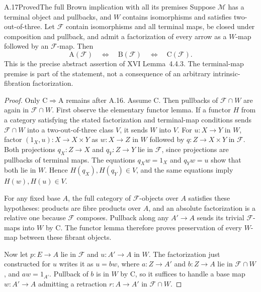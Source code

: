 \begin{claim}{A.17}{Proved}{The full Brown implication with all its premises}
Suppose $\mathcal M$ has a terminal object and pullbacks, and $W$ contains isomorphisms and satisfies two-out-of-three. Let $\mathcal F$ contain isomorphisms and all terminal maps, be closed under composition and pullback, and admit a factorization of every arrow as a $W$-map followed by an $\mathcal F$-map. Then
\[
\mathrm A(\mathcal F)\quad\Longleftrightarrow\quad
\mathrm B(\mathcal F)\quad\Longleftrightarrow\quad
\mathrm C(\mathcal F).
\]
This is the precise abstract assertion of XVI Lemma~4.4.3. The terminal-map premise is part of the statement, not a consequence of an arbitrary intrinsic-fibration factorization.
\end{claim}
\begin{proof}
Only $\mathrm C\Rightarrow\mathrm A$ remains after A.16. Assume C. Then pullbacks of $\mathcal F\cap W$ are again in $\mathcal F\cap W$. First observe the elementary functor lemma. If a functor $H$ from a category satisfying the stated factorization and terminal-map conditions sends $\mathcal F\cap W$ into a two-out-of-three class $V$, it sends $W$ into $V$. For $u:X\to Y$ in $W$, factor $(1_X,u):X\to X\times Y$ as $w:X\to Z$ in $W$ followed by $q:Z\to X\times Y$ in $\mathcal F$. Both projections $q_X:Z\to X$ and $q_Y:Z\to Y$ lie in $\mathcal F$, since projections are pullbacks of terminal maps. The equations $q_Xw=1_X$ and $q_Yw=u$ show that both lie in $W$. Hence $H(q_X),H(q_Y)\in V$, and the same equations imply $H(w),H(u)\in V$.

For any fixed base $A$, the full category of $\mathcal F$-objects over $A$ satisfies these hypotheses: products are fibre products over $A$, and an absolute factorization is a relative one because $\mathcal F$ composes. Pullback along any $A'\to A$ sends its trivial $\mathcal F$-maps into $W$ by C. The functor lemma therefore proves preservation of every $W$-map between these fibrant objects.

Now let $p:E\to A$ lie in $\mathcal F$ and $u:A'\to A$ in $W$. The factorization just constructed for $u$ writes it as $u=bw$, where $a:Z\to A'$ and $b:Z\to A$ lie in $\mathcal F\cap W$, and $aw=1_{A'}$. Pullback of $b$ is in $W$ by C, so it suffices to handle a base map $w:A'\to A$ admitting a retraction $r:A\to A'$ in $\mathcal F\cap W$.


\end{proof}
